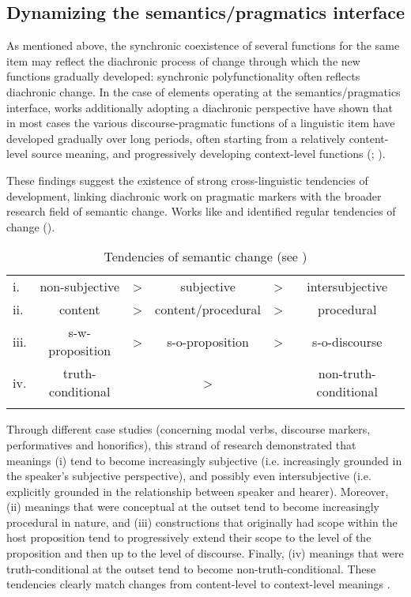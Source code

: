 \subsection{Dynamizing the semantics/pragmatics interface}
\hypertarget{Toc124860632}{}
As mentioned above, the synchronic coexistence of several functions for the same item may reflect the diachronic process of change through which the new functions gradually developed: synchronic polyfunctionality often reflects diachronic change. In the case of elements operating at the semantics/pragmatics interface, works additionally adopting a diachronic perspective have shown that in most cases the various discourse-pragmatic functions of a linguistic item have developed gradually over long periods, often starting from a relatively content-level source meaning, and progressively developing context-level functions (\citealt{Waltereit2006}; \citealt{Hansen2008}).

These findings suggest the existence of strong cross-linguistic tendencies of development, linking diachronic work on pragmatic markers with the broader research field of semantic change. Works like \citet{Traugott1989,Traugott1995,Traugott2010} and \citet{TraugottDasher2002} identified regular tendencies of change ().

\begin{table}
\begin{tabular}{lccccc}
\lsptoprule
i. & non-subjective & > & subjective & > & {intersubjective}\\
ii. & content & > & content/procedural & > & procedural\\
iii. & s-w-proposition & > & s-o-proposition & > & s-o-discourse\\
iv. & truth-conditional &  \multicolumn{3}{c}{>} & non-truth-conditional\\
\lspbottomrule
\end{tabular}
\caption{\label{tab:key:4.1} Tendencies of semantic change (see \citealt[40]{TraugottDasher2002})}
\end{table}

Through different case studies (concerning modal verbs, discourse markers, performatives and honorifics), this strand of research demonstrated that meanings (i) tend to become increasingly subjective (i.e. increasingly grounded in the speaker’s subjective perspective), and possibly even intersubjective (i.e. explicitly grounded in the relationship between speaker and hearer). Moreover, (ii) meanings that were conceptual at the outset tend to become increasingly procedural in nature, and (iii) constructions that originally had scope within the host proposition tend to progressively extend their scope to the level of the proposition and then up to the level of discourse. Finally, (iv) meanings that were truth-conditional at the outset tend to become non-truth-conditional. These tendencies clearly match changes from content-level to context-level meanings \citep[599]{Hansen2012}.

